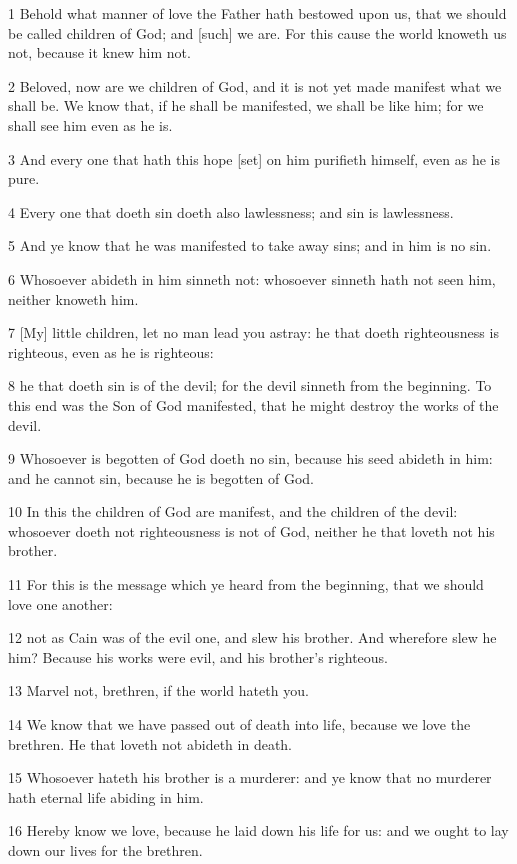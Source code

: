 \par 1 Behold what manner of love the Father hath bestowed upon us, that we should be called children of God; and [such] we are. For this cause the world knoweth us not, because it knew him not.
\par 2 Beloved, now are we children of God, and it is not yet made manifest what we shall be. We know that, if he shall be manifested, we shall be like him; for we shall see him even as he is.
\par 3 And every one that hath this hope [set] on him purifieth himself, even as he is pure.
\par 4 Every one that doeth sin doeth also lawlessness; and sin is lawlessness.
\par 5 And ye know that he was manifested to take away sins; and in him is no sin.
\par 6 Whosoever abideth in him sinneth not: whosoever sinneth hath not seen him, neither knoweth him.
\par 7 [My] little children, let no man lead you astray: he that doeth righteousness is righteous, even as he is righteous:
\par 8 he that doeth sin is of the devil; for the devil sinneth from the beginning. To this end was the Son of God manifested, that he might destroy the works of the devil.
\par 9 Whosoever is begotten of God doeth no sin, because his seed abideth in him: and he cannot sin, because he is begotten of God.
\par 10 In this the children of God are manifest, and the children of the devil: whosoever doeth not righteousness is not of God, neither he that loveth not his brother.
\par 11 For this is the message which ye heard from the beginning, that we should love one another:
\par 12 not as Cain was of the evil one, and slew his brother. And wherefore slew he him? Because his works were evil, and his brother's righteous.
\par 13 Marvel not, brethren, if the world hateth you.
\par 14 We know that we have passed out of death into life, because we love the brethren. He that loveth not abideth in death.
\par 15 Whosoever hateth his brother is a murderer: and ye know that no murderer hath eternal life abiding in him.
\par 16 Hereby know we love, because he laid down his life for us: and we ought to lay down our lives for the brethren.
